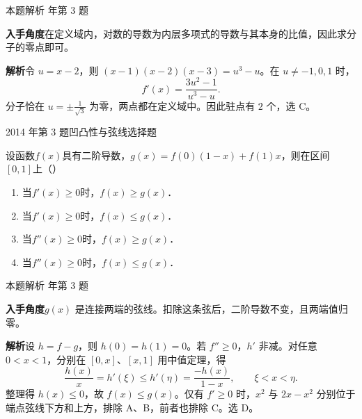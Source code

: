 \documentclass[UTF8,zihao=-4,fontset=fandol]{ctexart}
\newcommand{\pickout}{\hfill（\hspace{1.4em}）}
\newenvironment{abcd}{\begin{enumerate}[label=\textup{(\Alph*)},leftmargin=2.3em,itemsep=1pt,topsep=4pt,parsep=1pt]}{\end{enumerate}}
\newcommand{\QuestionPage}[6]{%
  \par\noindent\begin{minipage}{\linewidth}
  \raggedright
  {\small\textcolor{black!60}{#3\quad #5}\hfill\textcolor{accent}{#2}}\par\smallskip}
\newcommand{\QuestionEnd}{\end{minipage}\par\medskip}
\newcommand{\QuestionPage}[6]{%
  \clearpage
  {\small\textcolor{accent}{#1\hfill #2}}\par\medskip
  {\small\textcolor{black!60}{#3\quad #5\hfill #6}}\par\vspace{9bp}}
\newcommand{\QuestionEnd}{}
\newenvironment{QuestionSolution}[1]{%
  \clearpage
  {\small\textcolor{black!60}{本题解析\quad #1}}\par\medskip
}{\par\clearpage}
\begin{document}
\begin{QuestionSolution}{2011 年第 3 题}
\textbf{入手角度}\quad 在定义域内，对数的导数为内层多项式的导数与其本身的比值，因此求分子的零点即可。

\textbf{解析}\quad 令 \(u=x-2\)，则 \((x-1)(x-2)(x-3)=u^3-u\)。在 \(u\ne-1,0,1\) 时，
\[
f'(x)=\frac{3u^2-1}{u^3-u}.
\]
分子恰在 \(u=\pm\frac{1}{\sqrt3}\) 为零，两点都在定义域中。因此驻点有 \(\boxed{2}\) 个，选 C。
\end{QuestionSolution}

\QuestionPage{2.6 函数性态的研究}{选择题}{2014 年第 3 题}{1}{凹凸性与弦线}{106 / 234}
设函数$f(x)$具有二阶导数，$g(x) = f(0)(1 - x) + f(1)x$，则在区间$[0,1]$上\pickout{}
\begin{abcd}
\item 当$f'(x) \ge 0$时，$f(x) \ge g(x)$．
\item 当$f'(x) \ge 0$时，$f(x) \le g(x)$．
\item 当$f''(x) \ge 0$时，$f(x) \ge g(x)$．
\item 当$f''(x) \ge 0$时，$f(x) \le g(x)$．
\end{abcd}
\QuestionEnd

\begin{QuestionSolution}{2014 年第 3 题}
\textbf{入手角度}\quad \(g(x)\) 是连接两端的弦线。扣除这条弦后，二阶导数不变，且两端值归零。

\textbf{解析}\quad 设 \(h=f-g\)，则 \(h(0)=h(1)=0\)。若 \(f''\ge0\)，\(h'\) 非减。对任意 \(0<x<1\)，分别在 \([0,x]\)、\([x,1]\) 用中值定理，得
\[
\frac{h(x)}x=h'(\xi)\le h'(\eta)=\frac{-h(x)}{1-x},
\qquad \xi<x<\eta.
\]
整理得 \(h(x)\le0\)，故 \(f(x)\le g(x)\)。仅有 \(f'\ge0\) 时，\(x^2\) 与 \(2x-x^2\) 分别位于端点弦线下方和上方，排除 A、B，前者也排除 C。选 D。
\end{QuestionSolution}
\end{document}
